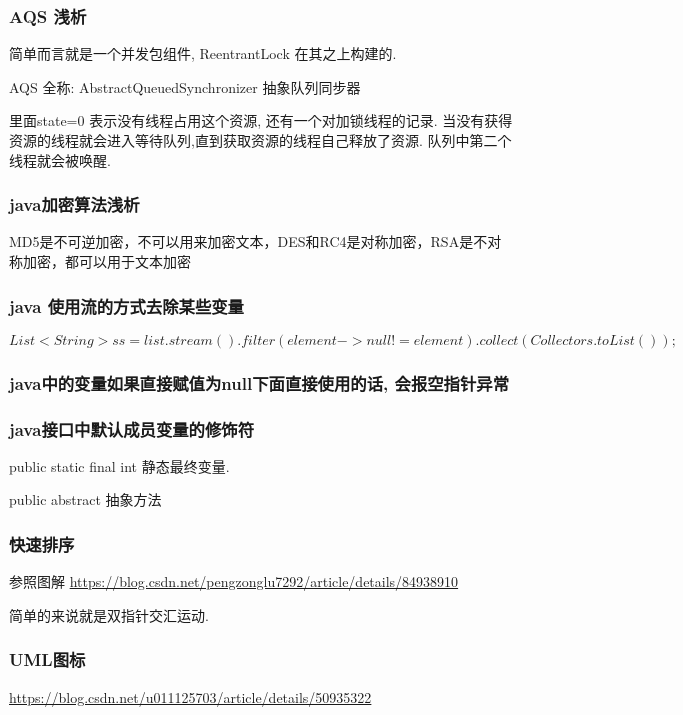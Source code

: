 \subsubsection{AQS 浅析}
简单而言就是一个并发包组件, ReentrantLock 在其之上构建的.

AQS 全称: AbstractQueuedSynchronizer 抽象队列同步器

里面state=0 表示没有线程占用这个资源, 还有一个对加锁线程的记录. 当没有获得资源的线程就会进入等待队列,直到获取资源的线程自己释放了资源. 队列中第二个线程就会被唤醒.

\subsubsection{java加密算法浅析}

MD5是不可逆加密，不可以用来加密文本，DES和RC4是对称加密，RSA是不对称加密，都可以用于文本加密
\subsubsection{java 使用流的方式去除某些变量}
$$
	List<String> ss = list.stream().filter(element->null!=element).collect(Collectors.toList());
$$
\subsubsection{java中的变量如果直接赋值为null下面直接使用的话, 会报空指针异常}


\subsubsection{java接口中默认成员变量的修饰符}

public static final int 静态最终变量.

public abstract  抽象方法

\subsubsection{快速排序}
参照图解
\url{https://blog.csdn.net/pengzonglu7292/article/details/84938910}

简单的来说就是双指针交汇运动.




\subsubsection{UML图标}

\url{https://blog.csdn.net/u011125703/article/details/50935322}

